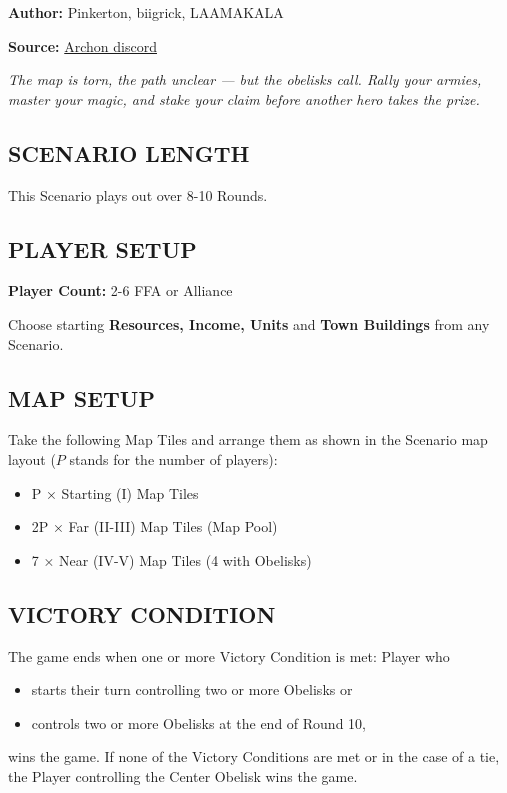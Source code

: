 
\begin{multicols*}{2}

\textbf{Author:} Pinkerton, biigrick, LAAMAKALA

\textbf{Source:} \href{<https://discord.com/channels/740870068178649108/1232319328049954826>}{Archon discord}

\textit{The map is torn, the path unclear — but the obelisks call. Rally your armies, master your magic, and stake your claim before another hero takes the prize.}

\subsection*{\MakeUppercase{Scenario Length}}
This Scenario plays out over 8-10 Rounds.

\subsection*{\MakeUppercase{Player Setup}}
\textbf{Player Count:} 2-6 FFA or Alliance

Choose starting \textbf{Resources, Income, Units} and \textbf{Town Buildings} from any Scenario.

\subsection*{\MakeUppercase{Map Setup}}
Take the following Map Tiles and arrange them as shown in the Scenario map layout ($P$ stands for the number of players):

\begin{itemize}
  \item P × Starting (I) Map Tiles
  \item 2P × Far (II-III) Map Tiles (Map Pool)
  \item 7 × Near (IV-V) Map Tiles (4 with Obelisks)
\end{itemize}

\subsection*{\MakeUppercase{Victory Condition}}
The game ends when one or more Victory Condition is met: Player who
\begin{itemize}
  \item starts their turn controlling two or more Obelisks or
  \item controls two or more Obelisks at the end of Round 10,
\end{itemize}
wins the game. If none of the Victory Conditions are met or in the case of a tie, the Player controlling the Center Obelisk wins the game.


\end{multicols*}
